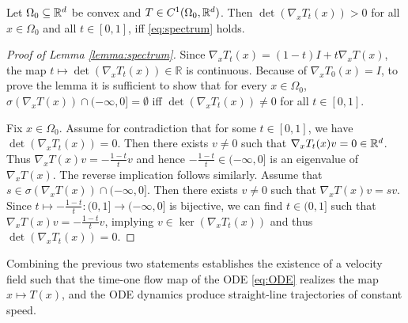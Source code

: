\begin{lemma}\label{lemma:spectrum}
  Let $\Omega_0\subseteq\mathbb{R}^d$ be convex and
    $T\in C^1(\Omega_0,\mathbb{R}^d)$. Then $\det(\nabla_x T_t(x))>0$ for all
    $x\in\Omega_0$ and all $t\in[0,1]$, iff \eqref{eq:spectrum} holds.
  
\end{lemma}
\begin{proof}[Proof of Lemma \ref{lemma:spectrum}]
  Since $\nabla_x T_t(x) = (1-t)I + t\nabla_x T(x)$, the map
    $t\mapsto\det(\nabla_x T_t(x))\in\mathbb{R}$ is continuous.
    Because of $\nabla_x T_0(x) = I$, to prove the lemma it is
  sufficient to show that for every $x\in\Omega_0$,
  $\sigma(\nabla_x T(x)) \cap (-\infty, 0] = \emptyset$ iff
  $\det(\nabla_x T_t(x))\neq 0$ for all $t\in[0,1]$.

  Fix $x\in\Omega_0$.  Assume for contradiction that for some
  $t\in[0,1]$, we have $\det(\nabla_x T_t(x)) = 0$. Then there
    exists $v\neq 0$ such that $\nabla_x T_t(x)v = 0\in\mathbb{R}^d$. Thus
  $\nabla_x T(x)v = -\frac{1-t}{t}v$ and hence
  $-\frac{1-t}{t}\in (-\infty,0]$ is an eigenvalue of
  $\nabla_x T(x)$. The reverse implication follows similarly.
    Assume that $s\in \sigma(\nabla_x T(x))\cap (-\infty,0]$.  Then
    there exists $v\neq 0$ such that $\nabla_x T(x)v=sv$. Since
    $t\mapsto -\frac{1-t}{t}:(0,1]\to (-\infty,0]$ is bijective, we
    can find $t\in (0,1]$ such that $\nabla_x T(x)v=-\frac{1-t}{t}v$,
    implying $v\in \ker(\nabla_xT_t(x))$ and thus
    $\det(\nabla_x T_t(x))=0$.
\end{proof}

Combining the previous two statements
establishes the existence of a velocity field such that the time-one
flow map of the ODE \eqref{eq:ODE} realizes the map
$x\mapsto T(x)$, and the ODE dynamics produce straight-line
trajectories of constant speed.  

